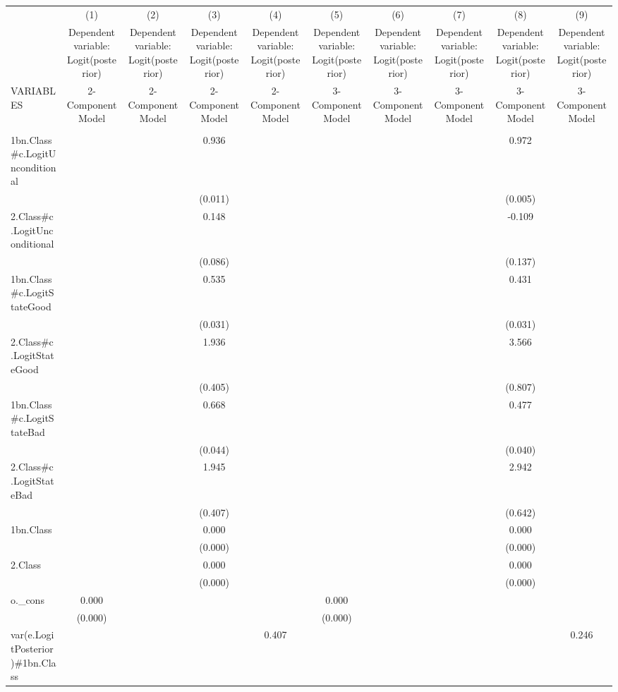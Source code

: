 \documentclass[]{article}
\begin{document}
\begin{tabular}{lccccccccc} \hline
 & (1) & (2) & (3) & (4) & (5) & (6) & (7) & (8) & (9) \\
 & Dependent variable: Logit(posterior) & Dependent variable: Logit(posterior) & Dependent variable: Logit(posterior) & Dependent variable: Logit(posterior) & Dependent variable: Logit(posterior) & Dependent variable: Logit(posterior) & Dependent variable: Logit(posterior) & Dependent variable: Logit(posterior) & Dependent variable: Logit(posterior) \\
VARIABLES & 2-Component Model & 2-Component Model & 2-Component Model & 2-Component Model & 3-Component Model & 3-Component Model & 3-Component Model & 3-Component Model & 3-Component Model \\ \hline
 &  &  &  &  &  &  &  &  &  \\
1bn.Class\#c.LogitUnconditional &  &  & 0.936 &  &  &  &  & 0.972 &  \\
 &  &  & (0.011) &  &  &  &  & (0.005) &  \\
2.Class\#c.LogitUnconditional &  &  & 0.148 &  &  &  &  & -0.109 &  \\
 &  &  & (0.086) &  &  &  &  & (0.137) &  \\
1bn.Class\#c.LogitStateGood &  &  & 0.535 &  &  &  &  & 0.431 &  \\
 &  &  & (0.031) &  &  &  &  & (0.031) &  \\
2.Class\#c.LogitStateGood &  &  & 1.936 &  &  &  &  & 3.566 &  \\
 &  &  & (0.405) &  &  &  &  & (0.807) &  \\
1bn.Class\#c.LogitStateBad &  &  & 0.668 &  &  &  &  & 0.477 &  \\
 &  &  & (0.044) &  &  &  &  & (0.040) &  \\
2.Class\#c.LogitStateBad &  &  & 1.945 &  &  &  &  & 2.942 &  \\
 &  &  & (0.407) &  &  &  &  & (0.642) &  \\
1bn.Class &  &  & 0.000 &  &  &  &  & 0.000 &  \\
 &  &  & (0.000) &  &  &  &  & (0.000) &  \\
2.Class &  &  & 0.000 &  &  &  &  & 0.000 &  \\
 &  &  & (0.000) &  &  &  &  & (0.000) &  \\
o.\_cons & 0.000 &  &  &  & 0.000 &  &  &  &  \\
 & (0.000) &  &  &  & (0.000) &  &  &  &  \\
var(e.LogitPosterior)\#1bn.Class &  &  &  & 0.407 &  &  &  &  & 0.246 \\

\end{tabular}
\end{document}
